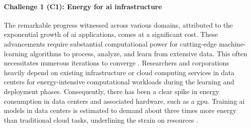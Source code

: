 \documentclass[12pt]{article}
\begin{document}
\paragraph*{\textbf{Challenge 1} (C1): Energy for \ac{ai} infrastructure}
The remarkable progress witnessed across various domains, attributed to the exponential growth of \ac{ai} applications, comes at a significant cost. These advancements require substantial computational power for cutting-edge machine-learning algorithms to process, analyze, and learn from extensive data. This often necessitates numerous iterations to converge \cite{Strubell2019EnergyPolicyConsiderations}. Researchers and corporations heavily depend on existing infrastructure or cloud computing services in data centers for energy-intensive computational workloads during the learning and deployment phases. Consequently, there has been a clear spike in energy consumption in data centers and associated hardware, such as a \ac{gpu}. Training \ac{ai} models in data centers is estimated to demand about three times more energy than traditional cloud tasks, underlining the strain on resources \cite{Thomas2023cloudusesmassive}.
\end{document}
